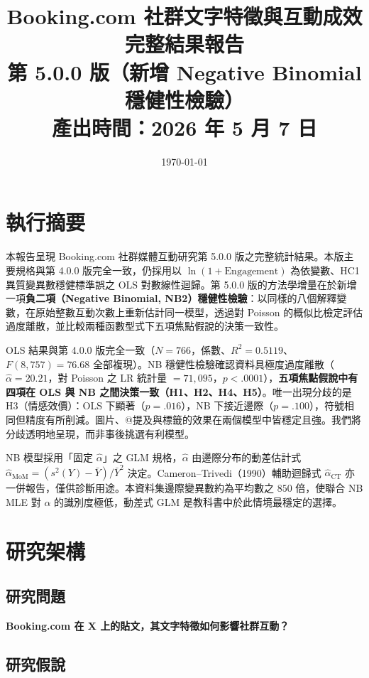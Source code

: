 \documentclass[12pt,a4paper]{ctexart}
\title{Booking.com 社群文字特徵與互動成效完整結果報告\\[0.3em]
\large 第 5.0.0 版（新增 Negative Binomial 穩健性檢驗）\\[0.3em]
\small 產出時間：2026 年 5 月 7 日}
\author{}
\date{\today}
\begin{document}
\maketitle
\tableofcontents
\newpage

\section*{執行摘要}

本報告呈現 Booking.com 社群媒體互動研究第 5.0.0 版之完整統計結果。本版主要規格與第 4.0.0 版完全一致，仍採用以 $\ln(1+\text{Engagement})$ 為依變數、HC1 異質變異數穩健標準誤之 OLS 對數線性迴歸。第 5.0.0 版的方法學增量在於新增一項\textbf{負二項（Negative Binomial, NB2）穩健性檢驗}：以同樣的八個解釋變數，在原始整數互動次數上重新估計同一模型，透過對 Poisson 的概似比檢定評估過度離散，並比較兩種函數型式下五項焦點假說的決策一致性。

OLS 結果與第 4.0.0 版完全一致（$N=766$，係數、$R^2=0.5119$、$F(8,757)=76.68$ 全部複現）。NB 穩健性檢驗確認資料具極度過度離散（$\hat\alpha=20.21$，對 Poisson 之 LR 統計量 $=71{,}095$，$p<.0001$），\textbf{五項焦點假說中有四項在 OLS 與 NB 之間決策一致（H1、H2、H4、H5）}。唯一出現分歧的是 H3（情感效價）：OLS 下顯著（$p=.016$），NB 下接近邊際（$p=.100$），符號相同但精度有所削減。圖片、@提及與標籤的效果在兩個模型中皆穩定且強。我們將分歧透明地呈現，而非事後挑選有利模型。

NB 模型採用「固定 $\hat\alpha$」之 GLM 規格，$\hat\alpha$ 由邊際分布的動差估計式 $\hat\alpha_{\text{MoM}}=(s^2(Y)-\bar Y)/\bar Y^2$ 決定。Cameron--Trivedi（1990）輔助迴歸式 $\hat\alpha_{\text{CT}}$ 亦一併報告，僅供診斷用途。本資料集邊際變異數約為平均數之 $850$ 倍，使聯合 NB MLE 對 $\alpha$ 的識別度極低，動差式 GLM 是教科書中於此情境最穩定的選擇。

\section{研究架構}

\subsection{研究問題}
\textbf{Booking.com 在 X 上的貼文，其文字特徵如何影響社群互動？}

\subsection{研究假說}
\end{document}
